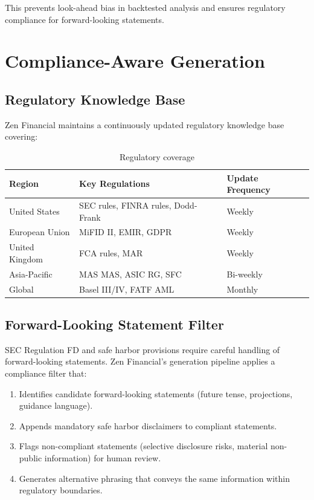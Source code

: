 \documentclass[11pt,a4paper]{article}
\begin{document}
This prevents look-ahead bias in backtested analysis and ensures regulatory compliance for forward-looking statements.

\section{Compliance-Aware Generation}

\subsection{Regulatory Knowledge Base}

Zen Financial maintains a continuously updated regulatory knowledge base covering:

\begin{table}[H]
\centering
\caption{Regulatory coverage}
\label{tab:regulatory}
\begin{tabular}{lll}
\toprule
Region & Key Regulations & Update Frequency \\
\midrule
United States & SEC rules, FINRA rules, Dodd-Frank & Weekly \\
European Union & MiFID II, EMIR, GDPR & Weekly \\
United Kingdom & FCA rules, MAR & Weekly \\
Asia-Pacific & MAS MAS, ASIC RG, SFC & Bi-weekly \\
Global & Basel III/IV, FATF AML & Monthly \\
\bottomrule
\end{tabular}
\end{table}

\subsection{Forward-Looking Statement Filter}

SEC Regulation FD and safe harbor provisions require careful handling of forward-looking statements. Zen Financial's generation pipeline applies a compliance filter that:

\begin{enumerate}
  \item Identifies candidate forward-looking statements (future tense, projections, guidance language).
  \item Appends mandatory safe harbor disclaimers to compliant statements.
  \item Flags non-compliant statements (selective disclosure risks, material non-public information) for human review.
  \item Generates alternative phrasing that conveys the same information within regulatory boundaries.
\end{enumerate}
\end{document}
